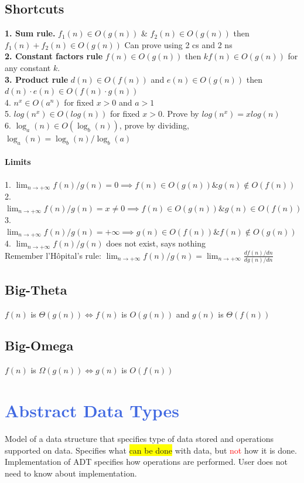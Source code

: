 \subsection{Shortcuts}
\textbf{1. Sum rule.} $f_1(n)\in O(g(n))$ \& $f_2(n)\in O(g(n))$ then $f_1(n)+f_2(n)\in O(g(n))$ Can prove using 2 cs and 2 ns
\\\textbf{2. Constant factors rule} $f(n)\in O(g(n))$ then $kf(n)\in O(g(n))$ for any constant $k$. 
\\\textbf{3. Product rule} $d(n)\in O(f(n))$ and $e(n)\in O(g(n))$ then $d(n)\cdot e(n)\in O(f(n)\cdot g(n))$
\\ 4. $n^x \in O(a^n)$ for fixed $x>0$ and $a>1$
\\ 5. $log(n^x)\in O(log(n))$ for fixed $x>0$. Prove by $log(n^x)=x log(n)$
\\ 6. $\log_a(n)\in O(\log_b(n))$, prove by dividing, $\log_a(n)=\log_b(n)/\log_b(a)$
\paragraph{Limits}
1. $\lim_{n\to +\infty}f(n)/g(n)=0\implies f(n)\in O(g(n)) \& g(n)\notin O(f(n))$
\\2. $\lim_{n\to +\infty}f(n)/g(n)=x\neq 0\implies f(n)\in O(g(n)) \& g(n)\in O(f(n))$
\\3. $\lim_{n\to +\infty}f(n)/g(n)=+\infty \implies g(n)\in O(f(n)) \& f(n)\notin O(g(n))$
\\4. $\lim_{n\to +\infty}f(n)/g(n)$ does not exist, says nothing
\\ Remember l'H\^opital's rule: $\lim_{n\to +\infty} f(n)/g(n)=\lim_{n\to +\infty} \frac{df(n)/dn}{dg(n)/dn}$
\subsection{Big-Theta}
$f(n)$ is $\Theta(g(n)) \iff f(n)$ is $O(g(n))$ and $g(n)$ is $\Theta(f(n))$
\subsection{Big-Omega}
$f(n)$ is $\Omega(g(n)) \iff g(n)$ is $O(f(n))$
\color{RoyalBlue}
\section{\textcolor{RoyalBlue}{Abstract Data Types}}
Model of a data structure that specifies type of data stored and operations supported on data. Specifies what \colorbox{Yellow}{can be done} with data, but \textcolor{Red}{not} how it is done. Implementation of ADT specifies how operations are performed. User does not need to know about implementation.
